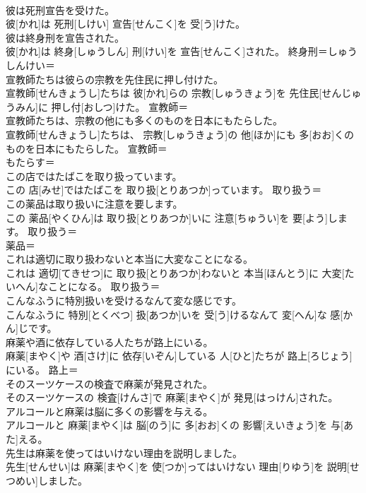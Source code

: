 \documentclass[8pt]{extreport}
\begin{document}
\begin{CJK}{UTF8}{min}
\\	彼は死刑宣告を受けた。	
\\	彼[かれ]は 死刑[しけい] 宣告[せんこく]を 受[う]けた。	
\\	彼は終身刑を宣告された。	
\\	彼[かれ]は 終身[しゅうしん] 刑[けい]を 宣告[せんこく]された。	終身刑＝しゅうしんけい＝ 
\\	宣教師たちは彼らの宗教を先住民に押し付けた。	
\\	宣教師[せんきょうし]たちは 彼[かれ]らの 宗教[しゅうきょう]を 先住民[せんじゅうみん]に 押し付[おしつ]けた。	宣教師＝ 
\\	宣教師たちは、宗教の他にも多くのものを日本にもたらした。	
\\	宣教師[せんきょうし]たちは、 宗教[しゅうきょう]の 他[ほか]にも 多[おお]くのものを日本にもたらした。	宣教師＝ 
\\	もたらす＝ 
\\	この店ではたばこを取り扱っています。	
\\	この 店[みせ]ではたばこを 取り扱[とりあつか]っています。	取り扱う＝ 
\\	この薬品は取り扱いに注意を要します。	
\\	この 薬品[やくひん]は 取り扱[とりあつか]いに 注意[ちゅうい]を 要[よう]します。	取り扱う＝ 
\\	薬品＝ 
\\	これは適切に取り扱わないと本当に大変なことになる。	
\\	これは 適切[てきせつ]に 取り扱[とりあつか]わないと 本当[ほんとう]に 大変[たいへん]なことになる。	取り扱う＝ 
\\	こんなふうに特別扱いを受けるなんて変な感じです。	
\\	こんなふうに 特別[とくべつ] 扱[あつか]いを 受[う]けるなんて 変[へん]な 感[かん]じです。	
\\	麻薬や酒に依存している人たちが路上にいる。	
\\	麻薬[まやく]や 酒[さけ]に 依存[いぞん]している 人[ひと]たちが 路上[ろじょう]にいる。	路上＝ 
\\	そのスーツケースの検査で麻薬が発見された。	
\\	そのスーツケースの 検査[けんさ]で 麻薬[まやく]が 発見[はっけん]された。	
\\	アルコールと麻薬は脳に多くの影響を与える。	
\\	アルコールと 麻薬[まやく]は 脳[のう]に 多[おお]くの 影響[えいきょう]を 与[あた]える。	
\\	先生は麻薬を使ってはいけない理由を説明しました。	
\\	先生[せんせい]は 麻薬[まやく]を 使[つか]ってはいけない 理由[りゆう]を 説明[せつめい]しました。	

\end{CJK}
\end{document}
